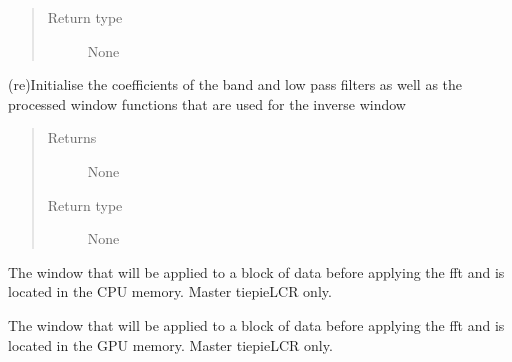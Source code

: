 \documentclass[letterpaper,10pt,english]{sphinxmanual}
\begin{document}
\begin{fulllineitems}
\begin{fulllineitems}
\begin{quote}
\begin{description}
\item[{Return type}] \leavevmode
\sphinxAtStartPar
None

\end{description}\end{quote}

\end{fulllineitems}


\begin{fulllineitems}
\label{\detokenize{index:TiePieLCR.TiePieLCR.update_filter_coefs}}
\sphinxAtStartPar
(re)Initialise the coefficients of the band and low pass filters as well as the processed window functions that are used for the inverse window
\begin{quote}\begin{description}
\item[{Returns}] \leavevmode
\sphinxAtStartPar
None

\item[{Return type}] \leavevmode
\sphinxAtStartPar
None

\end{description}\end{quote}

\end{fulllineitems}


\begin{fulllineitems}
\label{\detokenize{index:TiePieLCR.TiePieLCR.window_cpu}}
\sphinxAtStartPar
The window that will be applied to a block of data before applying the fft and is located in the CPU memory. Master tiepieLCR only.

\end{fulllineitems}


\begin{fulllineitems}
\label{\detokenize{index:TiePieLCR.TiePieLCR.window_gpu}}
\sphinxAtStartPar
The window that will be applied to a block of data before applying the fft and is located in the GPU memory. Master tiepieLCR only.

\end{fulllineitems}


\end{fulllineitems}
\end{document}

